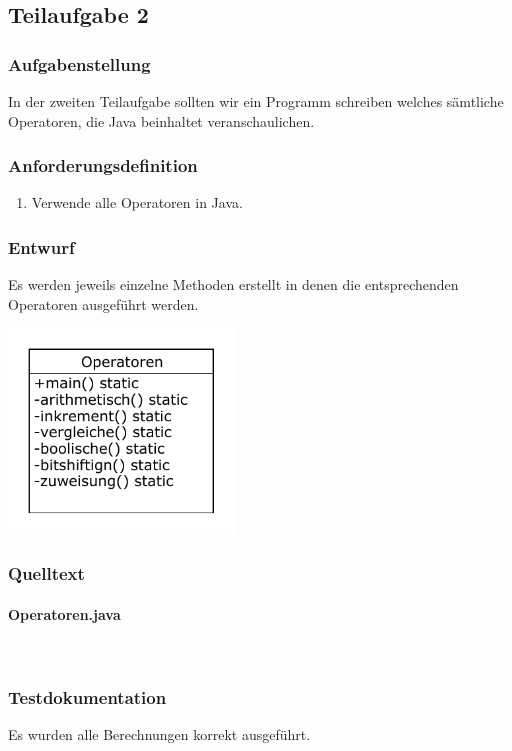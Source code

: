 \subsection{Teilaufgabe 2}
\subsubsection{Aufgabenstellung}
In der zweiten Teilaufgabe sollten wir ein Programm schreiben welches sämtliche Operatoren,
die Java beinhaltet veranschaulichen.

\subsubsection{Anforderungsdefinition}
\begin{enumerate}
	\item Verwende alle Operatoren in Java.
\end{enumerate}

\subsubsection{Entwurf}
Es werden jeweils einzelne Methoden erstellt in denen die entsprechenden Operatoren ausgeführt werden.
\begin{center}
	\includegraphics[width=0.45\textwidth]{uml/uml_c5_p2.pdf}
\end{center}

\subsubsection{Quelltext}
\paragraph{Operatoren.java}\


\subsubsection{Testdokumentation}
Es wurden alle Berechnungen korrekt ausgeführt.

